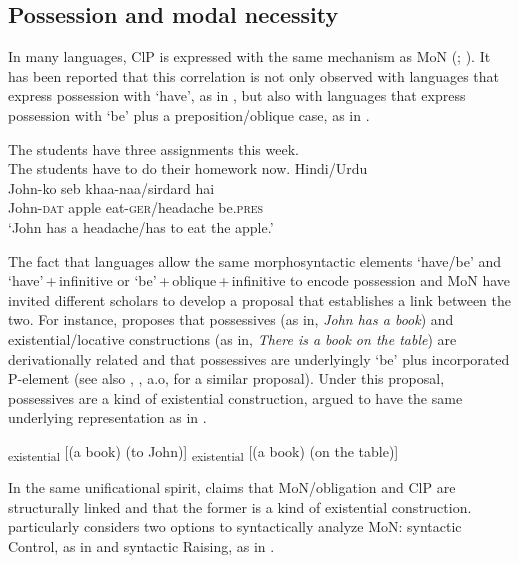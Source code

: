 \documentclass[output=paper]{langscibook}
\begin{document}
\subsection{Possession and modal necessity}\largerpage[2]
In many languages, ClP is expressed with the same mechanism as MoN (\citealt{bhatt97}; \citealt{cowperandbjorkman2016}). It has been reported that this correlation is not only observed with languages that express possession with `have', as in , but also with languages that express possession with `be' plus a preposition/oblique case, as in .

\ea\label{ex:Gebregziabher:have}
\ea The students have three assignments this week. \\ \citep[(1)]{cowperandbjorkman2016}
\ex The students have to do their homework now.
\z
\ex\label{ex:Gebregziabher:beto} Hindi/Urdu \citep[8]{bhatt97}\\
\gll John-ko seb khaa-naa/sirdard hai \\
John-{\scshape dat} apple eat-{\scshape ger}/headache be.{\scshape pres}\\
\glt `John has a headache/has to eat the apple.' 
\z

\begin{sloppypar}
\noindent The fact that languages allow the same morphosyntactic elements `have/be' and `have'\,+\,infinitive or `be'\,+\,oblique\,+\,infinitive to encode possession and MoN have invited different scholars to develop a proposal that establishes a link between the two. For instance, \citet{freeze92} proposes that possessives (as in, \emph{John has a book}) and existential/locative constructions (as in, \emph{There is a book on the table}) are derivationally related and that possessives are underlyingly `be' plus incorporated P-element (see also \citealt{harley1995}, \citealt{levinson2011}, a.o, for a similar proposal). Under this proposal, possessives are a kind of existential construction, argued to have the same underlying representation as in .
\end{sloppypar}

\ea\label{ex:Gebregziabher:existential}
\textsubscript{existential} [(a book) (to John)]
\textsubscript{existential} [(a book) (on the table)] 
\z
\z

\noindent In the same unificational spirit, \citet{bhatt97} claims that MoN/obligation and ClP are structurally linked and that the former is a kind of existential construction. \citeauthor{bhatt97} particularly considers two  options to syntactically analyze MoN: syntactic Control, as in  and syntactic Raising, as in .
\end{document}
